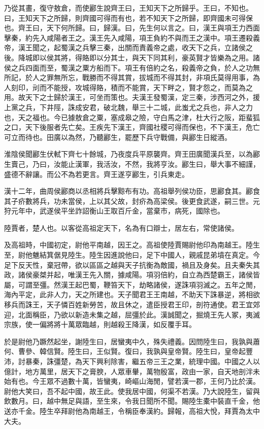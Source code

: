 乃從其畫，復守敖倉，而使酈生說齊王曰，王知天下之所歸乎。王曰，不知也。曰，王知天下之所歸，則齊國可得而有也，若不知天下之所歸，即齊國未可得保也。齊王曰，天下何所歸。曰，歸漢。曰，先生何以言之。曰，漢王與項王力西面擊秦，約先入咸陽者王之。漢王先入咸陽，項王負約不與而王之漢中。項王遷殺義帝，漢王聞之，起蜀漢之兵擊三秦，出關而責義帝之處，收天下之兵，立諸侯之後。降城即以侯其將，得賂即以分其士，與天下同其利，豪英賢才皆樂為之用。諸侯之兵四面而至，蜀漢之粟方船而下。項王有倍約之名，殺義帝之負，於人之功無所記，於人之罪無所忘，戰勝而不得其賞，拔城而不得其封，非項氏莫得用事，為人刻印，刓而不能授，攻城得賂，積而不能賞，天下畔之，賢才怨之，而莫為之用。故天下之士歸於漢王，可坐而策也。夫漢王發蜀漢，定三秦，涉西河之外，援上黨之兵，下井陘，誅成安君，破北魏，舉三十二城，此蚩尤之兵也，非人之力也，天之福也。今已據敖倉之粟，塞成皋之險，守白馬之津，杜大行之阪，距蜚狐之口，天下後服者先亡矣。王疾先下漢王，齊國社稷可得而保也，不下漢王，危亡可立而待也。田廣以為然，乃聽酈生，罷歷下兵守戰備，與酈生日縱酒。

淮陰侯聞酈生伏軾下齊七十餘城，乃夜度兵平原襲齊。齊王田廣聞漢兵至，以為酈生賣己，乃曰，汝能止漢軍，我活汝，不然，我將亨汝。酈生曰，舉大事不細謹，盛德不辭讓。而公不為若更言。齊王遂亨酈生，引兵東走。

漢十二年，曲周侯酈商以丞相將兵擊黥布有功。高祖舉列侯功臣，思酈食其。酈食其子疥數將兵，功未當侯，上以其父故，封疥為高梁侯。後更食武遂，嗣三世。元狩元年中，武遂侯平坐詐詔衡山王取百斤金，當棄市，病死，國除也。

陸賈者，楚人也。以客從高祖定天下，名為有口辯士，居左右，常使諸侯。

及高祖時，中國初定，尉他平南越，因王之。高祖使陸賈賜尉他印為南越王。陸生至，尉他魋結箕倨見陸生。陸生因進說他曰，足下中國人，親戚昆弟墳在真定。今足下反天性，棄冠帶，欲以區區之越與天子抗衡為敵國，禍且及身矣。且夫秦失其政，諸侯豪桀并起，唯漢王先入關，據咸陽。項羽倍約，自立為西楚霸王，諸侯皆屬，可謂至彊。然漢王起巴蜀，鞭笞天下，劫略諸侯，遂誅項羽滅之。五年之閒，海內平定，此非人力，天之所建也。天子聞君王王南越，不助天下誅暴逆，將相欲移兵而誅王，天子憐百姓新勞苦，故且休之，遣臣授君王印，剖符通使。君王宜郊迎，北面稱臣，乃欲以新造未集之越，屈彊於此。漢誠聞之，掘燒王先人冢，夷滅宗族，使一偏將將十萬眾臨越，則越殺王降漢，如反覆手耳。

於是尉他乃蹶然起坐，謝陸生曰，居蠻夷中久，殊失禮義。因問陸生曰，我孰與蕭何、曹參、韓信賢。陸生曰，王似賢。復曰，我孰與皇帝賢。陸生曰，皇帝起豐沛，討暴秦，誅彊楚，為天下興利除害，繼五帝三王之業，統理中國。中國之人以億計，地方萬里，居天下之膏腴，人眾車轝，萬物殷富，政由一家，自天地剖泮未始有也。今王眾不過數十萬，皆蠻夷，崎嶇山海閒，譬若漢一郡，王何乃比於漢。尉他大笑曰，吾不起中國，故王此。使我居中國，何渠不若漢。乃大說陸生，留與飲數月。曰，越中無足與語，至生來，令我日聞所不聞。賜陸生橐中裝直千金，他送亦千金。陸生卒拜尉他為南越王，令稱臣奉漢約。歸報，高祖大悅，拜賈為太中大夫。


